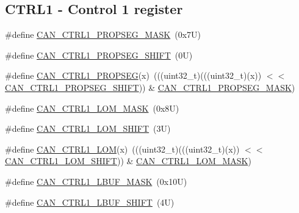\subsection*{C\+T\+R\+L1 -\/ Control 1 register}
\begin{DoxyCompactItemize}
\item 
\#define \mbox{\hyperlink{group___c_a_n___register___masks_ga0541429f7e3d35ec374c462a83c3ef49}{C\+A\+N\+\_\+\+C\+T\+R\+L1\+\_\+\+P\+R\+O\+P\+S\+E\+G\+\_\+\+M\+A\+SK}}~(0x7\+U)
\item 
\#define \mbox{\hyperlink{group___c_a_n___register___masks_ga7eada40e9f9aafd9d58c38b3a3b295b5}{C\+A\+N\+\_\+\+C\+T\+R\+L1\+\_\+\+P\+R\+O\+P\+S\+E\+G\+\_\+\+S\+H\+I\+FT}}~(0\+U)
\item 
\#define \mbox{\hyperlink{group___c_a_n___register___masks_ga57ce21067eb8d33398e104ce39eb5100}{C\+A\+N\+\_\+\+C\+T\+R\+L1\+\_\+\+P\+R\+O\+P\+S\+EG}}(x)~(((uint32\+\_\+t)(((uint32\+\_\+t)(x)) $<$$<$ \mbox{\hyperlink{group___c_a_n___register___masks_ga7eada40e9f9aafd9d58c38b3a3b295b5}{C\+A\+N\+\_\+\+C\+T\+R\+L1\+\_\+\+P\+R\+O\+P\+S\+E\+G\+\_\+\+S\+H\+I\+FT}})) \& \mbox{\hyperlink{group___c_a_n___register___masks_ga0541429f7e3d35ec374c462a83c3ef49}{C\+A\+N\+\_\+\+C\+T\+R\+L1\+\_\+\+P\+R\+O\+P\+S\+E\+G\+\_\+\+M\+A\+SK}})
\item 
\#define \mbox{\hyperlink{group___c_a_n___register___masks_gac216e0dd5c6df92a49c15077ca628187}{C\+A\+N\+\_\+\+C\+T\+R\+L1\+\_\+\+L\+O\+M\+\_\+\+M\+A\+SK}}~(0x8\+U)
\item 
\#define \mbox{\hyperlink{group___c_a_n___register___masks_gafd8f79e66670cb6df0d70e93795649c6}{C\+A\+N\+\_\+\+C\+T\+R\+L1\+\_\+\+L\+O\+M\+\_\+\+S\+H\+I\+FT}}~(3\+U)
\item 
\#define \mbox{\hyperlink{group___c_a_n___register___masks_ga2ffd5e38637c827fe6472ec8c7243631}{C\+A\+N\+\_\+\+C\+T\+R\+L1\+\_\+\+L\+OM}}(x)~(((uint32\+\_\+t)(((uint32\+\_\+t)(x)) $<$$<$ \mbox{\hyperlink{group___c_a_n___register___masks_gafd8f79e66670cb6df0d70e93795649c6}{C\+A\+N\+\_\+\+C\+T\+R\+L1\+\_\+\+L\+O\+M\+\_\+\+S\+H\+I\+FT}})) \& \mbox{\hyperlink{group___c_a_n___register___masks_gac216e0dd5c6df92a49c15077ca628187}{C\+A\+N\+\_\+\+C\+T\+R\+L1\+\_\+\+L\+O\+M\+\_\+\+M\+A\+SK}})
\item 
\#define \mbox{\hyperlink{group___c_a_n___register___masks_ga91b1b6502a9996e9639d28760d00ee88}{C\+A\+N\+\_\+\+C\+T\+R\+L1\+\_\+\+L\+B\+U\+F\+\_\+\+M\+A\+SK}}~(0x10\+U)
\item 
\#define \mbox{\hyperlink{group___c_a_n___register___masks_ga1ebb72a42560e1f78bb6f10cfeec8945}{C\+A\+N\+\_\+\+C\+T\+R\+L1\+\_\+\+L\+B\+U\+F\+\_\+\+S\+H\+I\+FT}}~(4\+U)

\end{DoxyCompactItemize}
